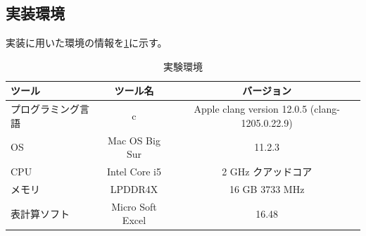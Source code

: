 \documentclass{jsarticle}
\begin{document}
\subsection{実装環境}
実装に用いた環境の情報を\ref{t2}に示す。
\begin{table}[htbp]
            \begin{center}
              \caption{実験環境}
                \label{t2}
                \begin{tabular}{l||c|c}
                    ツール & ツール名 & バージョン\\ \hline
                    プログラミング言語 & c & Apple clang version 12.0.5 (clang-1205.0.22.9)\\
                    OS & Mac OS Big Sur & 11.2.3\\
                    CPU & Intel Core i5 & 2 GHz クアッドコア \\
                    メモリ & LPDDR4X & 16 GB 3733 MHz  \\
                    表計算ソフト&Micro Soft Excel & 16.48\\
                    \end{tabular}
            \end{center}
        \end{table}
\end{document}
